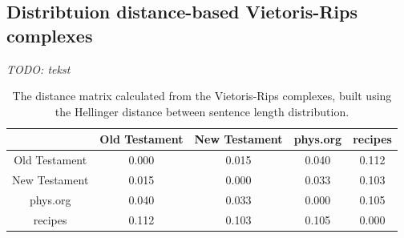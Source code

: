 \documentclass[12pt,a4paper]{amsart}
\begin{document}
\subsection{Distribtuion distance-based Vietoris-Rips complexes}

\emph{TODO: tekst}

\begin{table}
  \centering
  \begin{tabular}{c|cccc}
                  & Old Testament & New Testament & phys.org & recipes \\ \hline
    Old Testament & 0.000 & 0.015 & 0.040 & 0.112 \\
    New Testament & 0.015 & 0.000 & 0.033 & 0.103 \\
    phys.org      & 0.040 & 0.033 & 0.000 & 0.105 \\
    recipes       & 0.112 & 0.103 & 0.105 & 0.000 \\
  \end{tabular}

  \caption{The distance matrix calculated from the Vietoris-Rips complexes,
    built using the Hellinger distance between sentence length distribution.}
  \label{tab:hell}
\end{table}
\end{document}
